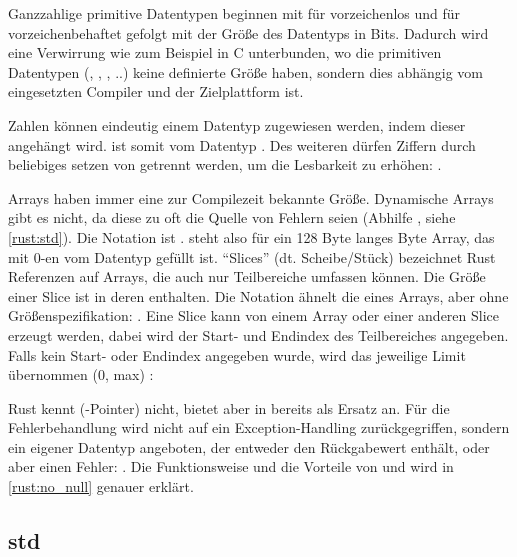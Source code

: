 Ganzzahlige primitive Datentypen beginnen mit  für vorzeichenlos und  für vorzeichenbehaftet gefolgt mit der Größe des Datentyps in Bits.
Dadurch wird eine Verwirrung wie zum Beispiel in C unterbunden, wo die primitiven Datentypen (, , , ..) keine definierte Größe haben, sondern dies abhängig vom eingesetzten Compiler und der Zielplattform ist. 

Zahlen können eindeutig einem Datentyp zugewiesen werden, indem dieser angehängt wird.
 ist somit vom Datentyp .
Des weiteren dürfen Ziffern durch beliebiges setzen von \rustcinline{_} getrennt werden, um die Lesbarkeit zu erhöhen: .

Arrays haben immer eine zur Compilezeit bekannte Größe. Dynamische Arrays gibt es nicht, da diese zu oft die Quelle von Fehlern seien  (Abhilfe , siehe \autoref{rust:std}).
Die Notation ist .
\rustcinline{[0_u8; 128]} steht also für ein 128 Byte langes Byte Array, das mit 0-en vom Datentyp  gefüllt ist.
\enquote{Slices} (dt. Scheibe/Stück) bezeichnet Rust Referenzen auf Arrays, die auch nur Teilbereiche umfassen können.
Die Größe einer Slice ist in deren   enthalten.
Die Notation ähnelt die eines Arrays, aber ohne Größenspezifikation: \rustcinline{[<Datentyp>]}.
Eine Slice kann von einem Array oder einer anderen Slice erzeugt werden, dabei wird der Start- und Endindex des Teilbereiches angegeben.
Falls kein Start- oder Endindex angegeben wurde, wird das jeweilige Limit übernommen (0, max) : 

Rust kennt (-Pointer) nicht, bietet aber in  bereits  als Ersatz an.
Für die Fehlerbehandlung wird nicht auf ein Exception-Handling zurückgegriffen, sondern ein eigener Datentyp angeboten, der entweder den Rückgabewert enthält, oder aber einen Fehler: .
Die Funktionsweise und die Vorteile von  und  wird in \autoref{rust:no_null} genauer erklärt.

\subsection{std}
\label{rust:std}

